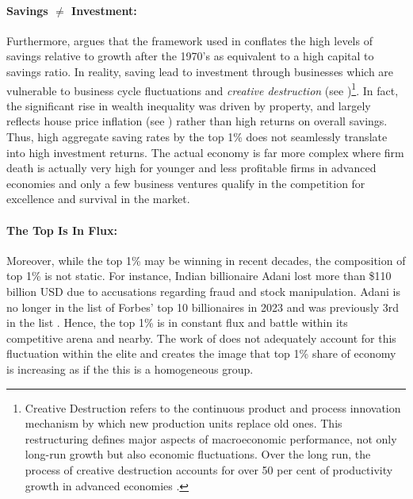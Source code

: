 \documentclass[12pt]{article}
\newcommand{\1}{\mathbbm 1}
\begin{document}
		
		
	
		
		\paragraph{Savings $\neq$ Investment:}
		
		Furthermore, \cite{soskice2014capital} argues that the framework used in \cite{piketty2017capital} conflates the high levels of savings relative to growth after the 1970's as equivalent to a high capital to savings ratio. In reality, saving lead to investment through businesses which are vulnerable to business cycle fluctuations and \textit{creative destruction} (see \cite{schumpeter1942})\footnote{Creative Destruction refers to the continuous product and process innovation mechanism by which new production units replace old ones. This restructuring defines major aspects of macroeconomic performance, not only long-run growth but also economic fluctuations. Over the long run, the process of creative destruction accounts for over 50 per cent of productivity growth in advanced economies \cite{soskice2014capital}.}. In fact, the significant rise in wealth inequality was driven by property, and largely reflects house price inflation (see \cite{bonnet2014does}) rather than high returns on overall savings. Thus, high aggregate saving rates by the top 1\% does not seamlessly translate into high investment returns. The actual economy is far more complex where firm death is actually very high for younger and less profitable firms in advanced economies \cite{mckenzie2019small} and only a few business ventures qualify in the competition for excellence and survival in the market. 
		
		
		\paragraph{The Top Is In Flux:}
		Moreover, while the top 1\% may be winning in recent decades, the composition of top 1\% is not static. For instance, Indian billionaire Adani lost more than \$110 billion USD due to accusations regarding fraud and stock manipulation. Adani is no longer in the list of Forbes' top 10 billionaires in 2023 and was previously 3rd in the list \cite{adani2023}. Hence, the top 1\% is in constant flux and battle within its competitive arena and nearby. The work of \cite{piketty2017capital} does not adequately account for this fluctuation within the elite and creates the image that top 1\% share of economy is increasing as if the this is a homogeneous group.
		
\end{document}
